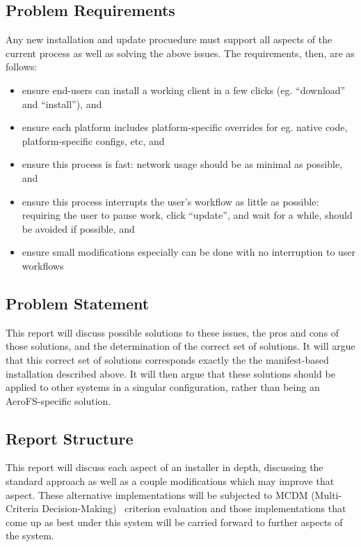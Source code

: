 \documentclass[12pt]{article}
\begin{document}
\subsection{Problem Requirements}
Any new installation and update procuedure must support all aspects of the current process as well as solving the above issues. The requirements, then, are as follows:
\begin{itemize}
\item ensure end-users can install a working client in a few clicks (eg. ``download'' and ``install''), and
\item ensure each platform includes platform-specific overrides for eg. native code, platform-specific configs, etc, and
\item ensure this process is fast: network usage should be as minimal as possible, and
\item ensure this process interrupts the user's workflow as little as possible: requiring the user to pause work, click ``update'', and wait for a while, should be avoided if possible, and
\item ensure small modifications especially can be done with no interruption to user workflows
\end{itemize}

\subsection{Problem Statement}
This report will discuss possible solutions to these issues, the pros and cons of those solutions, and the determination of the correct set of solutions. It will argue that this correct set of solutions corresponds exactly the the manifest-based installation described above. It will then argue that these solutions should be applied to other systems in a singular configuration, rather than being an AeroFS-specific solution.

\subsection{Report Structure}
This report will discuss each aspect of an installer in depth, discussing the standard approach as well as a couple modifications which may improve that aspect. These alternative implementations will be subjected to MCDM (Multi-Criteria Decision-Making)~\cite{mcda} criterion evaluation and those implementations that come up as best under this system will be carried forward to further aspects of the system.
\end{document}

